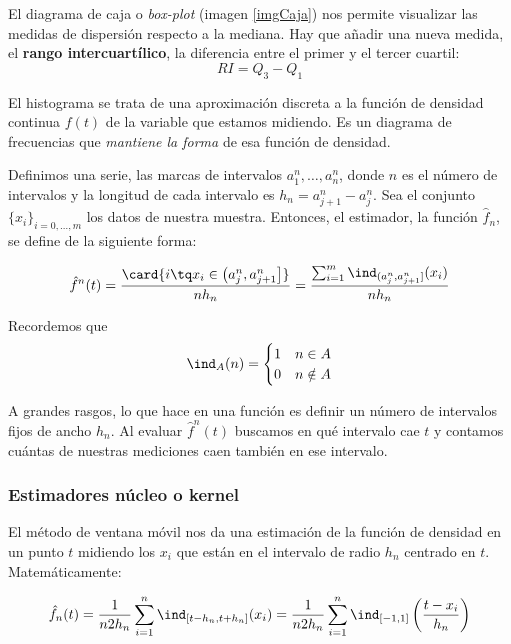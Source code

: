\documentclass{apuntes}
\begin{document}
\begin{defn}
El diagrama de caja o \textit{box-plot}  (imagen \ref{imgCaja}) nos permite visualizar las medidas de dispersión respecto a la mediana. Hay que añadir una nueva medida, el \textbf{rango intercuartílico}, la diferencia entre el primer y el tercer cuartil: \[RI = Q_3 - Q_1 \]

\end{defn}

\begin{defn}[Histograma]
El histograma se trata de una aproximación discreta a la función de densidad continua $f(t)$ de la variable que estamos midiendo. Es un diagrama de frecuencias que \textit{mantiene la forma} de esa función de densidad. 

Definimos una serie, las marcas de intervalos $a^n_1, \dotsc, a^n_n$, donde $n$ es el número de intervalos y la longitud de cada intervalo  es $h_n = a^n_{j+1} - a^n_j$. Sea el conjunto $\{x_i\}_{i=0,\dotsc,m}$ los datos de nuestra muestra. Entonces, el estimador, la función $\hat{f}_n$, se define de la siguiente forma:

\[ \hat{f}^n(t) = \frac{\card{i \tq x_i \in \left( a_j^n, a_{j+1}^n \right]}}{n h_n} = \frac{\sum_{i=1}^m \ind_{(a_j^n, a_{j+1}^n]} (x_i)}{n h_n} \]

Recordemos que \[ \ind_A (n) = \begin{cases} 1 & n \in A \\ 0 & n \notin A\end{cases}\]

A grandes rasgos, lo que hace en una función es definir un número de intervalos fijos de ancho $h_n$. Al evaluar $\hat{f}^n(t)$ buscamos en qué intervalo cae $t$ y contamos cuántas de nuestras mediciones caen también en ese intervalo.


\end{defn}

\subsubsection{Estimadores núcleo o kernel}
\label{secEst}
\begin{defn}
El método de ventana móvil nos da una estimación de la función de densidad en un punto $t$ midiendo los $x_i$ que están en el intervalo de radio $h_n$ centrado en $t$. Matemáticamente:

\[ \hat{f}_n(t) = \frac{1}{n2h_n}\sum_{i=1}^n \ind_{[t-h_n, t+h_n]}(x_i) = \frac{1}{n2h_n}\sum_{i=1}^n \ind_{[-1,1]}\left(\frac{t-x_i}{h_n}\right) \]
\end{defn}
\end{document}
